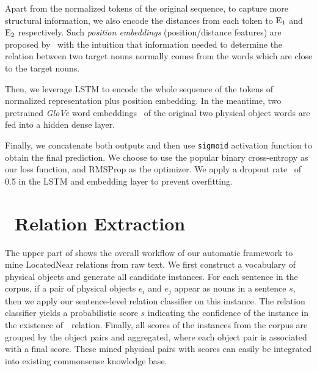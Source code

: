 Apart from the normalized tokens of the original sequence, to capture more structural information, we also encode the distances from each token to $\textnormal E_1$ and $\textnormal E_2$ respectively.
{Such \textit{{position embeddings}} (position/distance features) are proposed by~\cite{zeng2014relation} with the intuition that information needed to determine the relation between two target nouns normally comes from the words which are close to the target nouns.} 


Then, we leverage LSTM to encode the whole sequence of the tokens of normalized representation plus position embedding. 
In the meantime, two pretrained \textit{GloVe} word embeddings~\cite{pennington2014glove} of the original two physical object words are fed into a hidden dense layer. 

Finally, we concatenate both outputs and then use \texttt{sigmoid} activation function to obtain the final prediction.
We choose to use the popular binary cross-entropy as our loss function, and
RMSProp as the optimizer. We apply a dropout rate~\cite{zaremba2014recurrent} of 0.5 in the LSTM and embedding layer to prevent overfitting.

\section{\lnear\  Relation Extraction}
\label{sec:mine}
The upper part of  shows the overall workflow of our automatic framework to mine LocatedNear relations from raw text.
We first construct a vocabulary of physical objects and generate all candidate instances. 
For each sentence in the corpus, if a pair of physical objects $e_i$ and $e_j$ appear as nouns in a sentence $s$, then we apply our sentence-level relation classifier on this instance. 
The relation classifier yields a probabilistic score $s$
indicating the confidence of the instance in the existence of~\lnear~relation.
Finally, all scores of the instances from the corpus are grouped by the object pairs and aggregated, where each object
pair is associated with a final score. 
These mined physical pairs with scores can easily be integrated into existing commonsense knowledge base.

